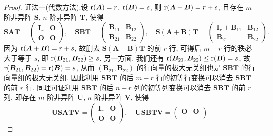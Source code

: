 \documentclass[../../main.tex]{subfiles}
\begin{document}
\begin{proof}
{\color{blue}证法一(代数方法):}设 ${\rm r}(\boldsymbol{A}) = r$, ${\rm r}(\boldsymbol{B}) = s$, 则 ${\rm r}(\boldsymbol{A} + \boldsymbol{B}) = r + s$, 且存在 $m$ 阶非异阵 $\boldsymbol{S}$, $n$ 阶非异阵 $\boldsymbol{T}$, 使得
$$
\boldsymbol{S}\boldsymbol{A}\boldsymbol{T} = \begin{pmatrix}
\boldsymbol{I}_r & \boldsymbol{O} \\
\boldsymbol{O} & \boldsymbol{O}
\end{pmatrix}, \quad \boldsymbol{S}\boldsymbol{B}\boldsymbol{T} = \begin{pmatrix}
\boldsymbol{B}_{11} & \boldsymbol{B}_{12} \\
\boldsymbol{B}_{21} & \boldsymbol{B}_{22}
\end{pmatrix}, \quad \boldsymbol{S}(\boldsymbol{A} + \boldsymbol{B})\boldsymbol{T} = \begin{pmatrix}
\boldsymbol{I}_r + \boldsymbol{B}_{11} & \boldsymbol{B}_{12} \\
\boldsymbol{B}_{21} & \boldsymbol{B}_{22}
\end{pmatrix}.
$$
因为 ${\rm r}(\boldsymbol{A} + \boldsymbol{B}) = r + s$, 故删去 $\boldsymbol{S}(\boldsymbol{A} + \boldsymbol{B})\boldsymbol{T}$ 的前 $r$ 行, 可得后 $m - r$ 行的秩必大于等于 $s$, 即 ${\rm r}(\boldsymbol{B}_{21}, \boldsymbol{B}_{22}) \geq s$. 另一方面, 我们还有 ${\rm r}(\boldsymbol{B}_{21}, \boldsymbol{B}_{22}) \leq {\rm r}(\boldsymbol{B}) = s$, 故 ${\rm r}(\boldsymbol{B}_{21}, \boldsymbol{B}_{22}) = {\rm r}(\boldsymbol{B}) = s$, 从而 $(\boldsymbol{B}_{21}, \boldsymbol{B}_{22})$ 的行向量的极大无关组也是 $\boldsymbol{S}\boldsymbol{B}\boldsymbol{T}$ 的行向量组的极大无关组. 因此利用 $\boldsymbol{S}\boldsymbol{B}\boldsymbol{T}$ 的后 $m - r$ 行的初等行变换可以消去 $\boldsymbol{S}\boldsymbol{B}\boldsymbol{T}$ 的前 $r$ 行. 同理可证利用 $\boldsymbol{S}\boldsymbol{B}\boldsymbol{T}$ 的后 $n - r$ 列的初等列变换可以消去 $\boldsymbol{S}\boldsymbol{B}\boldsymbol{T}$ 的前 $r$ 列, 即存在 $m$ 阶非异阵 $\boldsymbol{U}$, $n$ 阶非异阵 $\boldsymbol{V}$, 使得
$$
\boldsymbol{U}\boldsymbol{S}\boldsymbol{A}\boldsymbol{T}\boldsymbol{V} = \begin{pmatrix}
\boldsymbol{I}_r & \boldsymbol{O} \\
\boldsymbol{O} & \boldsymbol{O}
\end{pmatrix}, \quad \boldsymbol{U}\boldsymbol{S}\boldsymbol{B}\boldsymbol{T}\boldsymbol{V} = \begin{pmatrix}
\boldsymbol{O} & \boldsymbol{O} \\

\end{pmatrix}$$
\end{proof}
\end{document}
